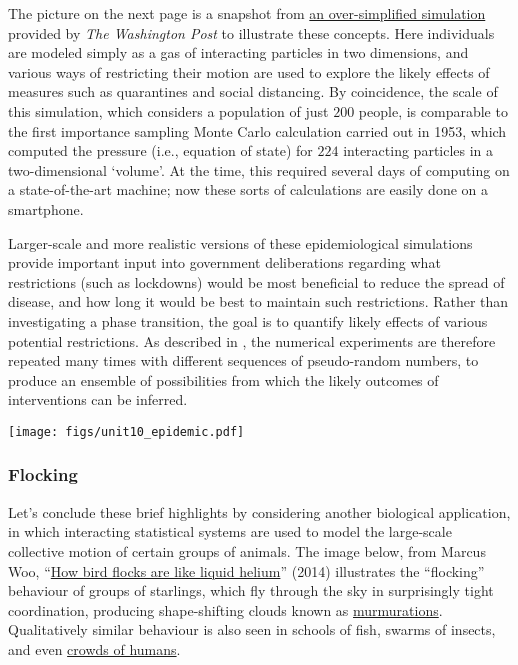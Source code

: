 The picture on the next page is a snapshot from \href{https://web.archive.org/web/20230729023947/https://www.washingtonpost.com/graphics/2020/world/corona-simulator/}{an over-simplified simulation} provided by \textit{The Washington Post} to illustrate these concepts.
Here individuals are modeled simply as a gas of interacting particles in two dimensions, and various ways of restricting their motion are used to explore the likely effects of measures such as quarantines and social distancing.
By coincidence, the scale of this simulation, which considers a population of just $200$ people, is comparable to the first importance sampling Monte Carlo calculation carried out in 1953, which computed the pressure (i.e., equation of state) for $224$ interacting particles in a two-dimensional `volume'.
At the time, this required several days of computing on a state-of-the-art machine; now these sorts of calculations are easily done on a smartphone.

Larger-scale and more realistic versions of these epidemiological simulations provide important input into government deliberations regarding what restrictions (such as lockdowns) would be most beneficial to reduce the spread of disease, and how long it would be best to maintain such restrictions.
Rather than investigating a phase transition, the goal is to quantify likely effects of various potential restrictions.
As described in , the numerical experiments are therefore repeated many times with different sequences of pseudo-random numbers, to produce an ensemble of possibilities from which the likely outcomes of interventions can be inferred.

\begin{center}\texttt{[image: figs/unit10\_epidemic.pdf]}\end{center}

\subsubsection*{Flocking}
Let's conclude these brief highlights by considering another biological application, in which interacting statistical systems are used to model the large-scale collective motion of certain groups of animals.
The image below, from Marcus Woo, ``\href{https://www.sciencemag.org/news/2014/07/how-bird-flocks-are-liquid-helium}{How bird flocks are like liquid helium}'' (2014) illustrates the ``flocking'' behaviour of groups of starlings, which fly through the sky in surprisingly tight coordination, producing shape-shifting clouds known as \href{https://www.youtube.com/watch?v=V4f_1_r80RY}{murmurations}.
Qualitatively similar behaviour is also seen in schools of fish, swarms of insects, and even \href{https://doi.org/10.1038/s41586-024-08514-6}{crowds of humans}.

